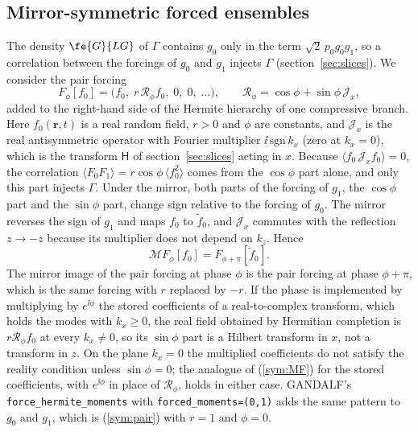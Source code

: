 \subsection{Mirror-symmetric forced ensembles}\label{sym:ensembles}

The density $\fe{G}{LG}$ of $\Gamma$ contains $g_0$ only in the term $\sqrt2\,p_0g_0g_1$, so a correlation between the forcings of $g_0$ and $g_1$ injects $\Gamma$ (section~\ref{sec:slices}). We consider the pair forcing
\begin{equation}\label{sym:pair}
  F_\phi[f_0]=\big(f_0,\;r\,\mathcal R_\phi f_0,\;0,\;0,\;\dots\big),\qquad
  \mathcal R_\phi=\cos\phi+\sin\phi\,\mathcal J_x ,
\end{equation}
added to the right-hand side of the Hermite hierarchy of one compressive branch. Here $f_0(\boldsymbol r,t)$ is a real random field, $r>0$ and $\phi$ are constants, and $\mathcal J_x$ is the real antisymmetric operator with Fourier multiplier $\ii\,\mathrm{sgn}\,k_x$ (zero at $k_x=0$), which is the transform $\mathsf H$ of section~\ref{sec:slices} acting in $x$. Because $\langle f_0\,\mathcal J_xf_0\rangle=0$, the correlation $\langle F_0F_1\rangle=r\cos\phi\,\langle f_0^2\rangle$ comes from the $\cos\phi$ part alone, and only this part injects $\Gamma$. Under the mirror, both parts of the forcing of $g_1$, the $\cos\phi$ part and the $\sin\phi$ part, change sign relative to the forcing of $g_0$. The mirror reverses the sign of $g_1$ and maps $f_0$ to $\tilde f_0$, and $\mathcal J_x$ commutes with the reflection $z\to-z$ because its multiplier does not depend on $k_z$. Hence
\begin{equation}\label{sym:MF}
  \mathcal MF_\phi[f_0]=F_{\phi+\pi}[\tilde f_0] .
\end{equation}
The mirror image of the pair forcing at phase $\phi$ is the pair forcing at phase $\phi+\pi$, which is the same forcing with $r$ replaced by $-r$. If the phase is implemented by multiplying by $e^{\ii\phi}$ the stored coefficients of a real-to-complex transform, which holds the modes with $k_x\ge0$, the real field obtained by Hermitian completion is $r\mathcal R_\phi f_0$ at every $k_x\neq0$, so its $\sin\phi$ part is a Hilbert transform in $x$, not a transform in $z$. On the plane $k_x=0$ the multiplied coefficients do not satisfy the reality condition unless $\sin\phi=0$; the analogue of (\ref{sym:MF}) for the stored coefficients, with $e^{\ii\phi}$ in place of $\mathcal R_\phi$, holds in either case. GANDALF's \texttt{force\_hermite\_\allowbreak moments} with \texttt{forced\_moments=(0,1)} adds the same pattern to $g_0$ and $g_1$, which is (\ref{sym:pair}) with $r=1$ and $\phi=0$.

